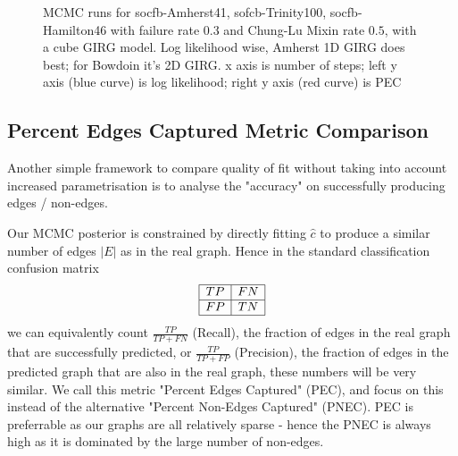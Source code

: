 \begin{figure}



  \caption{MCMC runs for socfb-Amherst41, sofcb-Trinity100, socfb-Hamilton46 with failure rate $0.3$ and Chung-Lu Mixin rate $0.5$, with a cube GIRG model. Log likelihood wise, Amherst 1D GIRG does best; for Bowdoin it's 2D GIRG.
  x axis is number of steps; left y axis (blue curve) is log likelihood; right y axis (red curve) is PEC}
  \label{fig:mcmc_runs}
\end{figure}

\subsection{Percent Edges Captured Metric Comparison}
Another simple framework to compare quality of fit without taking into account increased parametrisation is to analyse the "accuracy" on successfully producing edges / non-edges.

Our MCMC posterior is constrained by directly fitting $\hat{c}$ to produce a similar number of edges $|E|$ as in the real graph. Hence in the standard classification confusion matrix
\begin{equation}
  \begin{array}{|c|c|}
    \hline
    TP & FN \\
    \hline
    FP & TN \\
    \hline
    \end{array}
\end{equation}
we can equivalently count $\frac{TP}{TP + FN}$ (Recall), the fraction of edges in the real graph that are successfully predicted, or $\frac{TP}{TP + FP}$ (Precision), the fraction of edges in the predicted graph that are also in the real graph, these numbers will be very similar. We call this metric "Percent Edges Captured" (PEC), and focus on this instead of the alternative "Percent Non-Edges Captured" (PNEC). PEC is preferrable as our graphs are all relatively sparse - hence the PNEC is always high as it is dominated by the large number of non-edges.


